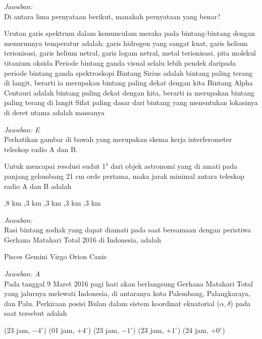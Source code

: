 \documentclass[11pt,fleqn, a4paper]{exam}
\begin{document}
\begin{questions}
\textit{Jawaban: }\\


\vspace{0.5cm}
\question Di antara lima pernyataan berikut, manakah pernyataan yang benar?  
\begin{choices}
\choice Urutan garis spektrum dalam kemunculam meraka pada bintang-bintang dengan menurunnya temperatur adalah: garis hidrogen yang sangat kuat, garis helium terionisasi, garis helium netral, garis logam netral, metal terionisasi, pita molekul titanium oksida
\choice Periode bintang ganda visual selalu lebih pendek daripada periode bintang ganda spektroskopi
\choice Bintang Sirius adalah bintang paling terang di langit, berarti ia merupakan bintang paling dekat dengan kita
\choice Bintang Alpha Centauri adalah bintang paling dekat dengan kita, berarti ia merupakan bintang paling terang di langit
\choice Sifat paling dasar dari bintang yang menentukan lokasinya di deret utama adalah massanya 
\end{choices}

\textit{Jawaban: E}\\


\vspace{0.5cm}
\question Perhatikan gambar di bawah yang merupakan skema kerja interferometer teleskop radio A dan B.


Untuk mencapai resolusi sudut 1" dari objek astronomi yang di amati pada panjang gelombang 21 cm orde pertama, maka jarak minimal antara teleskop radio A dan B adalah
\begin{choices}
,8 km 
,3 km
,3 km
,3 km
,3 km
\end{choices}

\textit{Jawaban: }\\


\vspace{0.5cm}
\question Rasi bintang zodiak yang dapat diamati pada saat bersamaan dengan peristiwa Gerhana Matahari Total 2016  di Indonesia, adalah
\begin{choices}
\choice Pisces
\choice Gemini
\choice Virgo
\choice Orion
\choice Canis
\end{choices}

\textit{Jawaban: A}\\


\vspace{0.5cm}
\question Pada tanggal 9 Maret 2016 pagi hari akan berlangsung Gerhana Matahari Total yang jalurnya melewati Indonesia, di antaranya kota Palembang, Palangkaraya, dan Palu. Perkiraan posisi Bulan dalam sistem koordinat ekuatorial ($\alpha, \delta$) pada saat tersebut adalah
\begin{choices}
\choice (23 jam, $-4^{\circ}$)
\choice (01 jam, $+4^{\circ}$)
\choice (23 jam, $-1^{\circ}$)
\choice (23 jam, $+1^{\circ}$)
\choice (24 jam, $+0^{\circ}$)
\end{choices}


\end{questions}
\end{document}
